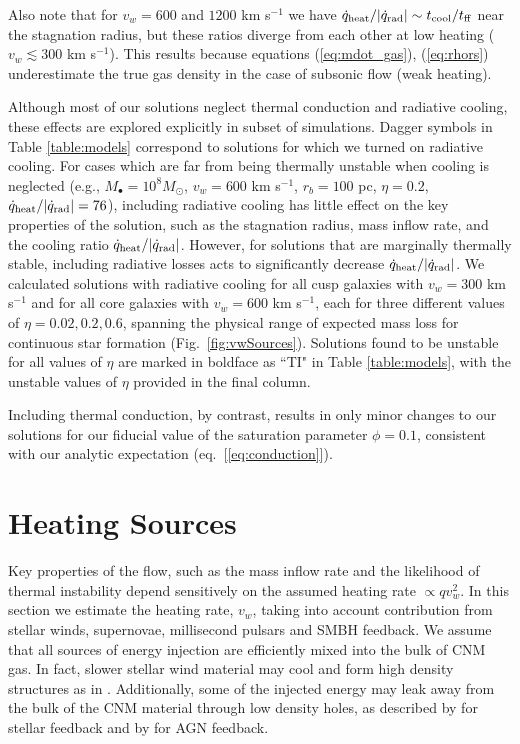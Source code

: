 \documentclass[usenatbib,fleqn]{mn2e}
\begin{document}
Also note that for $v_{w}=600$ and $1200$ km s$^{-1}$ we have
$\dot{q}_{\rm heat}/|\dot{q}_{\rm rad}| \sim t_{\rm cool}/t_{\rm ff}$
near the stagnation radius, but these ratios diverge from each other
at low heating ($v_{w} \lesssim 300$ km s$^{-1}$).  This results
because equations (\ref{eq:mdot_gas}), (\ref{eq:rhors}) underestimate
the true gas density in the case of subsonic flow (weak heating).

Although most of our solutions neglect thermal conduction and
radiative cooling, these effects are explored explicitly in subset of
simulations.  Dagger symbols in Table \ref{table:models} correspond to
solutions for which we turned on radiative cooling.  For cases which
are far from being thermally unstable when cooling is neglected (e.g.,
$M_{\bullet} = 10^{8}M_{\odot}$, $v_{w} = 600$ km s$^{-1}$, $r_{b} =
100$ pc, $\eta = 0.2$, $\dot{q}_{\rm heat}/|\dot{q}_{\rm rad}| = 76$),
including radiative cooling has little effect on the key properties of
the solution, such as the stagnation radius, mass inflow rate, and
the cooling ratio $\dot{q}_{\rm heat}/|\dot{q}_{\rm rad}|$.  However,
for solutions that are marginally thermally stable, including
radiative losses acts to significantly decrease $\dot{q}_{\rm
  heat}/|\dot{q}_{\rm rad}|$.  We calculated solutions with radiative
cooling for all cusp galaxies with $v_w=300$ km s$^{-1}$ and for all
core galaxies with $v_w=600 $ km s$^{-1}$, each for three different
values of $\eta = 0.02, 0.2, 0.6$, spanning the physical range of
expected mass loss for continuous star formation
(Fig.~\ref{fig:vwSources}).  Solutions found to be unstable for all
values of $\eta$ are marked in boldface as ``TI" in Table
\ref{table:models}, with the unstable values of $\eta$ provided in the
final column.

Including thermal conduction, by contrast, results in only minor
changes to our solutions for our fiducial value of the saturation
parameter $\phi = 0.1$, consistent with our analytic expectation
(eq.~[\ref{eq:conduction}]).

\section{Heating Sources}
\label{sec:heating}

Key properties of the flow, such as the mass inflow rate and the
likelihood of thermal instability depend sensitively on the assumed
heating rate $\propto qv_{w}^{2}$.  In this section we estimate the
heating rate, $v_w$, taking into account contribution from stellar
winds, supernovae, millisecond pulsars and SMBH feedback. We assume
that all sources of energy injection are efficiently mixed into the
bulk of CNM gas. In fact, slower stellar wind material may cool and
form high density structures as in \citet{Cuadra+2005}. Additionally,
some of the injected energy may leak away from the bulk of the CNM
material through low density holes, as described by
\citet{Harper-Clark+2009} for stellar feedback and by
\citet{Zubovas+2014} for AGN feedback.
\end{document}
